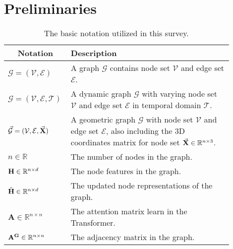 \section{Preliminaries}
\label{sec.prelimiary}
\renewcommand{\arraystretch}{1.3}
\begin{table}[htbp!]
  \centering
  \caption{The basic notation utilized in this survey.}
    \begin{tabular}{m{0.2\linewidth}<{\centering} m{0.7\linewidth}<{\raggedright}}
    \toprule
    \multicolumn{1}{c}{\centering\textbf{Notation}} & \multicolumn{1}{l}{\textbf{Description}} \\
    \midrule
    $\mathcal G = (\mathcal V, \mathcal E)$   & A graph $\mathcal G$ contains node set $\mathcal V$ and edge set $\mathcal E$.  \\ \hline
    $\mathcal G = (\mathcal V, \mathcal E, \mathcal T)$ & A dynamic graph $\mathcal G$ with varying node set $\mathcal V$ and edge set $\mathcal E$ in temporal domain $\mathcal T$.  \\ \hline
    $\mathcal{\vec{G}} = (\mathcal V, \mathcal E, \vec{\mathbf{X}})$ & A geometric graph $\mathcal G$ with node set $\mathcal V$ and edge set $\mathcal E$, also including the 3D coordinates matrix for node set $\vec{\mathbf{X}} \in \mathbb R^{n \times 3}$.  \\ \hline
    $n \in \mathbb R $   & The number of nodes in the graph. \\ \hline

    $\mathbf{H} \in \mathbb{R}^{n\times d}$   & The node features in the graph. \\ \hline
    $\Tilde{\mathbf{H}} \in \mathbb{R}^{n\times d}$   & The updated node representations of the graph. \\ \hline
    $\mathbf{A} \in \mathbb R^{n \times n}$ & The attention matrix learn in the Transformer.\\ \hline
    $\mathbf{A}^{\mathbf{G}} \in \mathbb R^{n \times n}$ & The adjacency matrix in the graph.\\ \hline


\end{tabular}
\end{table}
